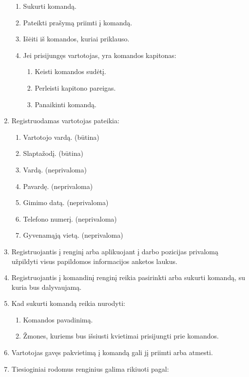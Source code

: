 \documentclass{VUMIFPSkursinis}
\begin{document}
\begin{enumerate}[label=\textbf{FR\arabic*}]
\begin{enumerate}[label*=\textbf{.\arabic*}]
						\item Sukurti komandą.
						\item Pateikti prašymą priimti į komandą.
						\item Išėiti iš komandos, kuriai priklauso.
						\item Jei prisijungęs vartotojas, yra komandos kapitonas:
						\begin{enumerate}[label*=\textbf{.\arabic*}]
							\item Keisti komandos sudėtį.
							\item Perleisti kapitono pareigas.
							\item Panaikinti komandą.
						\end{enumerate}
					\end{enumerate}				
				\item Registruodamas vartotojas pateikia:
					\begin{enumerate}[label*=\textbf{.\arabic*}]
						\item Vartotojo vardą. (būtina)
						\item Slaptažodį. (būtina)
						\item Vardą. (neprivaloma)
						\item Pavardę. (neprivaloma)
						\item Gimimo datą. (neprivaloma)
						\item Telefono numerį. (neprivaloma)
						\item Gyvenamąją vietą. (neprivaloma)
					\end{enumerate}
				\item Registruojantis į renginį arba aplikuojant į darbo pozicijas privalomą užpildyti visus papildomos informacijos anketos laukus.
				\item Registruojantis į komandinį renginį reikia pasirinkti arba sukurti komandą, su kuria bus dalyvaujamą.
				\item Kad sukurti komandą reikia nurodyti:
					\begin{enumerate}[label*=\textbf{.\arabic*}]
						\item Komandos pavadinimą.
						\item Žmones, kuriems bus išsiusti kvietimai prisijungti prie komandos.
					\end{enumerate}
				\item Vartotojas gavęs pakvietimą į komandą gali jį priimti arba atmesti.
				\item Tiesioginiai rodomus renginius galima rikiuoti pagal:
					\begin{enumerate}[label*=\textbf{.\arabic*}]

\end{enumerate}
\end{enumerate}
\end{document}
